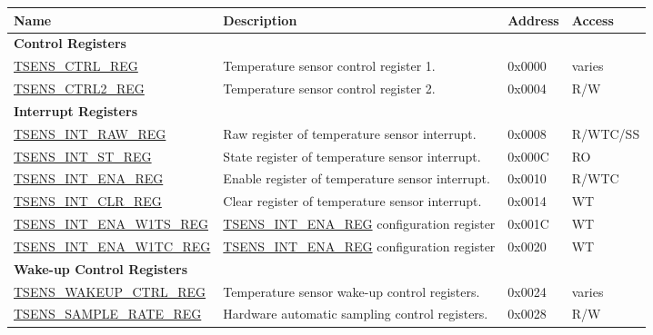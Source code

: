\begin{longtable}{ | p{5cm} | p{7.5cm} | p{1.3cm} | p{2cm} | }
\hline\rowcolor{lightgray}
\textbf{Name} & \textbf{Description} &  \textbf{Address} & \textbf{Access} \\ \hline
\endhead
\multicolumn{4}{|l|}{\textbf{Control Registers}} \\ \hline
\hyperref[regdesc:TSENSCTRLREG]{TSENS\_CTRL\_REG} & Temperature sensor control register 1. & 0x0000 & varies \\ \hline
\hyperref[regdesc:TSENSCTRL2REG]{TSENS\_CTRL2\_REG} & Temperature sensor control register 2. & 0x0004 & R/W \\ \hline
\multicolumn{4}{|l|}{\textbf{Interrupt Registers}} \\ \hline
\hyperref[regdesc:TSENSINTRAWREG]{TSENS\_INT\_RAW\_REG} & Raw register of temperature sensor interrupt. & 0x0008 & R/WTC/SS \\ \hline
\hyperref[regdesc:TSENSINTSTREG]{TSENS\_INT\_ST\_REG} & State register of temperature sensor interrupt. & 0x000C & RO \\ \hline
\hyperref[regdesc:TSENSINTENAREG]{TSENS\_INT\_ENA\_REG} & Enable register of temperature sensor interrupt. & 0x0010 & R/WTC \\ \hline
\hyperref[regdesc:TSENSINTCLRREG]{TSENS\_INT\_CLR\_REG} & Clear register of temperature sensor interrupt. & 0x0014 & WT \\ \hline
\hyperref[regdesc:TSENSINTENAW1TSREG]{TSENS\_INT\_ENA\_W1TS\_REG} & \hyperref[regdesc:TSENSINTENAREG]{TSENS\_INT\_ENA\_REG} configuration register & 0x001C & WT \\ \hline
\hyperref[regdesc:TSENSINTENAW1TCREG]{TSENS\_INT\_ENA\_W1TC\_REG} & \hyperref[regdesc:TSENSINTENAREG]{TSENS\_INT\_ENA\_REG} configuration register & 0x0020 & WT \\ \hline
\multicolumn{4}{|l|}{\textbf{Wake-up Control Registers}} \\ \hline
\hyperref[regdesc:TSENSWAKEUPCTRLREG]{TSENS\_WAKEUP\_CTRL\_REG} & Temperature sensor wake-up control registers. & 0x0024 & varies \\ \hline
\hyperref[regdesc:TSENSSAMPLERATEREG]{TSENS\_SAMPLE\_RATE\_REG} & Hardware automatic sampling control registers. & 0x0028 & R/W \\ \hline
\end{longtable}
